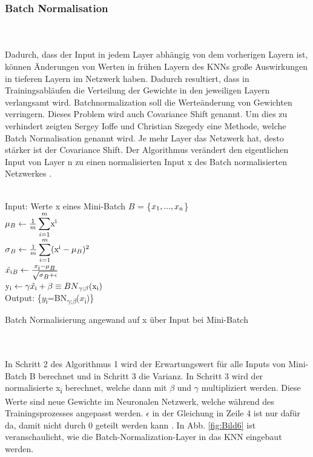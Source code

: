 \documentclass{llncs}
\begin{document}
\subsubsection{Batch Normalisation}
~\\\\
Dadurch, dass der Input in jedem Layer abhängig von dem vorherigen Layern ist, können Änderungen von Werten in frühen Layern des KNNs große Auswirkungen in tieferen Layern im Netzwerk haben. Dadurch resultiert, dass in Trainingsabläufen die Verteilung der Gewichte in den jeweiligen Layern verlangsamt wird. Batchnormalization soll die Werteänderung von Gewichten verringern. Dieses Problem wird auch Covariance Shift genannt. Um dies zu verhindert zeigten Sergey Ioffe und Christian Szegedy \cite{batchnorm} eine Methode, welche Batch Normalisation genannt wird. Je mehr Layer das Netzwerk hat, desto stärker ist der Covariance Shift. Der Algorithmus verändert den eigentlichen Input von Layer n zu einen normalisierten Input x des Batch normalisierten Netzwerkes \cite{batchnorm}.
\\\\
\begin{algorithm}[H]
	Input: Werte x eines Mini-Batch $B$ = \{$x\textsubscript{1},...,x\textsubscript{n}$\}\\
	\begin{math}
	\mu\textsubscript{$B$}\leftarrow\frac{1}{m}\displaystyle\sum_{i=1}^{m}$x$\textsuperscript{i}
	\end{math}\\
	\begin{math}
	\sigma\textsubscript{$B$}\leftarrow\frac{1}{m}\displaystyle\sum_{i=1}^{m}($x$\textsuperscript{i} - \mu\textsubscript{$B$})\textsuperscript{2}
	\end{math}\\
	\begin{math}
	\hat{x\textsubscript{i}}\textsubscript{$B$}\leftarrow\frac{x\textsubscript{i}-\mu\textsubscript{$B$}}{\sqrt{\sigma\textsubscript{$B$} + \epsilon}}
	\end{math}\\
	\begin{math}
	$y$\textsubscript{i}\leftarrow\gamma\hat{x\textsubscript{i}} + \beta \equiv BN\textsubscript{$\gamma$;$\beta$}($x$\textsubscript{i})
	\end{math}\\
	Output: \{$y$\textsubscript{i}=BN\textsubscript{$\gamma$;$\beta$}($x$\textsubscript{i})\}
	\caption{Batch Normalisierung angewand auf x über Input bei Mini-Batch  }	
\end{algorithm}
~\\\\
In Schritt 2 des Algorithmus 1 wird der Erwartungswert für alle Inputs von Mini-Batch B berechnet und in Schritt 3 die Varianz. In Schritt 3 wird der normalisierte x\textsubscript{i} berechnet, welche dann mit $\beta$ und $\gamma$ multipliziert werden. Diese Werte sind neue Gewichte im Neuronalen Netzwerk, welche während des Trainingsprozesses angepasst werden. $\epsilon$ in der Gleichung in Zeile 4 ist nur dafür da, damit nicht durch 0 geteilt werden kann \cite{batchnorm}. In Abb. \ref{fig:Bild6} ist veranschaulicht, wie die Batch-Normalization-Layer in das KNN eingebaut werden. 
\end{document}
